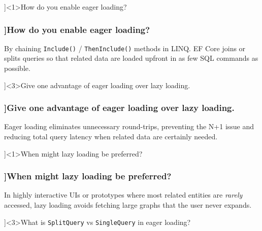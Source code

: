\QuestionSlide[\CategoryBadge[PerfColor!20]{Async \& Threading}]<1>{How do you enable eager loading?}

\begin{frame}[fragile]
  \frametitle{\AnswerTitle[\CategoryBadge[OOPColor!20]{C\#} ]{How do you enable eager loading?}}

  {\footnotesize
  By chaining \texttt{Include()} / \texttt{ThenInclude()} methods in LINQ.
  EF Core joins or splits queries so that related data are loaded upfront
  in as few SQL commands as possible.
  }
\end{frame}

\QuestionSlide[\CategoryBadge[PerfColor!20]{Async \& Threading}]<3>{Give one advantage of eager loading over lazy loading.}

\begin{frame}[fragile]
  \frametitle{\AnswerTitle[\CategoryBadge[OOPColor!20]{C\#} ]{Give one advantage of eager loading over lazy loading.}}

  {\footnotesize
  Eager loading eliminates unnecessary round-trips, preventing the N+1 issue
  and reducing total query latency when related data are certainly needed.
  }
\end{frame}

\QuestionSlide[\CategoryBadge[PerfColor!20]{Async \& Threading}]<1>{When might lazy loading be preferred?}

\begin{frame}[fragile]
  \frametitle{\AnswerTitle[\CategoryBadge[OOPColor!20]{C\#} ]{When might lazy loading be preferred?}}

  {\footnotesize
  In highly interactive UIs or prototypes where most related entities
  are \emph{rarely} accessed, lazy loading avoids fetching large graphs
  that the user never expands.
  }
\end{frame}

\QuestionSlide[\CategoryBadge[PerfColor!20]{Async \& Threading}]<3>{What is \texttt{SplitQuery} vs \texttt{SingleQuery} in eager loading?}

